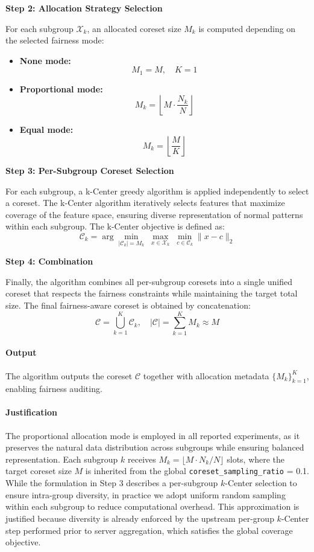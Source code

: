 \documentclass{article}
\begin{document}
\textbf{Step 2: Allocation Strategy Selection}

For each subgroup $\mathcal{X}_k$, an allocated coreset size $M_k$ is computed depending on the selected fairness mode:

\begin{itemize}
    \item \textbf{None mode:}
    \[
    M_1 = M, \quad K = 1
    \]

    \item \textbf{Proportional mode:}
    \[
    M_k = \left\lfloor M \cdot \frac{N_k}{N} \right\rfloor
    \]

    \item \textbf{Equal mode:}
    \[
    M_k = \left\lfloor \frac{M}{K} \right\rfloor
    \]
\end{itemize}

\textbf{Step 3: Per-Subgroup Coreset Selection}

For each subgroup, a k-Center greedy algorithm is applied independently to select a coreset. The k-Center algorithm iteratively selects features that maximize coverage of the feature space, ensuring diverse representation of normal patterns within each subgroup. The k-Center objective is defined as:
\[
\mathcal{C}_k = \arg\min_{|\mathcal{C}_k| = M_k} \; \max_{x \in \mathcal{X}_k} \; \min_{c \in \mathcal{C}_k} \| x - c \|_2
\]

\textbf{Step 4: Combination}

Finally, the algorithm combines all per-subgroup coresets into a single unified coreset that respects the fairness constraints while maintaining the target total size. The final fairness-aware coreset is obtained by concatenation:
\[
\mathcal{C} = \bigcup_{k=1}^K \mathcal{C}_k, \quad |\mathcal{C}| = \sum_{k=1}^K M_k \approx M
\]

\paragraph{Output}

The algorithm outputs the coreset $\mathcal{C}$ together with allocation metadata $\{M_k\}_{k=1}^K$, enabling fairness auditing.

\paragraph*{Justification}

The proportional allocation mode is employed in all reported experiments, as it preserves the natural data distribution across subgroups while ensuring balanced representation. Each subgroup $k$ receives $M_k = \lfloor M \cdot N_k / N \rfloor$ slots, where the target coreset size $M$ is inherited from the global \texttt{coreset\_sampling\_ratio} = 0.1. While the formulation in Step 3 describes a per-subgroup $k$-Center selection to ensure intra-group diversity, in practice we adopt uniform random sampling within each subgroup to reduce computational overhead. This approximation is justified because diversity is already enforced by the upstream per-group $k$-Center step performed prior to server aggregation, which satisfies the global coverage objective.
\end{document}
